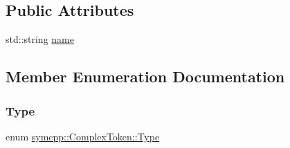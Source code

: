 \subsection*{Public Attributes}
\begin{DoxyCompactItemize}
\item 
std\+::string \mbox{\hyperlink{structsymcpp_1_1ComplexToken_a0a731b7c110006afd8a1a44b400d19b4}{name}}
\end{DoxyCompactItemize}


\subsection{Member Enumeration Documentation}
\mbox{\label{structsymcpp_1_1ComplexToken_a5d5ae44d6f5862b7e3a409156ac54ae3}} 
\subsubsection{\texorpdfstring{Type}{Type}}
{\footnotesize\ttfamily enum \mbox{\hyperlink{structsymcpp_1_1ComplexToken_a5d5ae44d6f5862b7e3a409156ac54ae3}{symcpp\+::\+Complex\+Token\+::\+Type}}}


